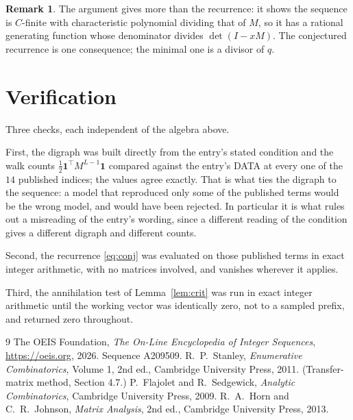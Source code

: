 \documentclass[11pt,a4paper]{article}
\theoremstyle{plain}
\theoremstyle{definition}
\newtheorem{remark}[theorem]{Remark}
\begin{document}
\begin{remark}
The argument gives more than the recurrence: it shows the sequence is $C$-finite with
characteristic polynomial dividing that of $M$, so it has a rational generating function
whose denominator divides $\det(I-xM)$. The conjectured recurrence is one consequence; the
minimal one is a divisor of $q$.
\end{remark}

\section{Verification}

Three checks, each independent of the algebra above.

First, the digraph was built directly from the entry's stated condition and the walk counts
$\tfrac1{2}\mathbf{1}^{\!\top}M^{L-1}\mathbf{1}$ compared against the entry's DATA at
every one of the $14$ published indices; the values agree exactly. That is what ties
the digraph to the sequence: a model that reproduced only some of the published terms would
be the wrong model, and would have been rejected. In particular it is what rules out a
misreading of the entry's wording, since a different reading of the condition gives a
different digraph and different counts.

Second, the recurrence \eqref{eq:conj} was evaluated on those published terms in exact
integer arithmetic, with no matrices involved, and vanishes wherever it applies.

Third, the annihilation test of Lemma~\ref{lem:crit} was run in exact integer arithmetic
until the working vector was identically zero, not to a sampled prefix, and returned zero
throughout.

\begin{thebibliography}{9}
 The OEIS Foundation, \emph{The On-Line Encyclopedia of Integer
Sequences}, \url{https://oeis.org}, 2026. Sequence A209509.
 R.~P.~Stanley, \emph{Enumerative Combinatorics}, Volume 1, 2nd ed.,
Cambridge University Press, 2011. (Transfer-matrix method, Section 4.7.)
 P.~Flajolet and R.~Sedgewick, \emph{Analytic Combinatorics}, Cambridge
University Press, 2009.
 R.~A.~Horn and C.~R.~Johnson, \emph{Matrix Analysis}, 2nd ed., Cambridge
University Press, 2013.
\end{thebibliography}
\end{document}

